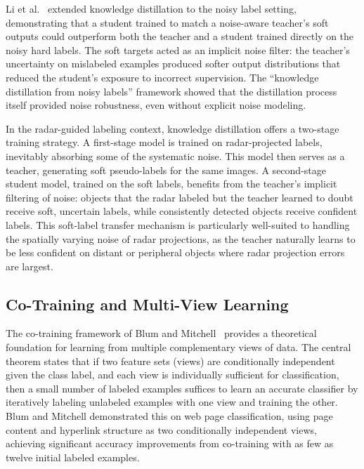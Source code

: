 Li et al.~\cite{li2017learning} extended knowledge distillation to the noisy label setting, demonstrating that a student trained to match a noise-aware teacher's soft outputs could outperform both the teacher and a student trained directly on the noisy hard labels. The soft targets acted as an implicit noise filter: the teacher's uncertainty on mislabeled examples produced softer output distributions that reduced the student's exposure to incorrect supervision. The ``knowledge distillation from noisy labels'' framework showed that the distillation process itself provided noise robustness, even without explicit noise modeling.

In the radar-guided labeling context, knowledge distillation offers a two-stage training strategy. A first-stage model is trained on radar-projected labels, inevitably absorbing some of the systematic noise. This model then serves as a teacher, generating soft pseudo-labels for the same images. A second-stage student model, trained on the soft labels, benefits from the teacher's implicit filtering of noise: objects that the radar labeled but the teacher learned to doubt receive soft, uncertain labels, while consistently detected objects receive confident labels. This soft-label transfer mechanism is particularly well-suited to handling the spatially varying noise of radar projections, as the teacher naturally learns to be less confident on distant or peripheral objects where radar projection errors are largest.



\subsection{Co-Training and Multi-View Learning}\label{subsec:cotraining}

The co-training framework of Blum and Mitchell~\cite{blum1998combining} provides a theoretical foundation for learning from multiple complementary views of data. The central theorem states that if two feature sets (views) are conditionally independent given the class label, and each view is individually sufficient for classification, then a small number of labeled examples suffices to learn an accurate classifier by iteratively labeling unlabeled examples with one view and training the other. Blum and Mitchell demonstrated this on web page classification, using page content and hyperlink structure as two conditionally independent views, achieving significant accuracy improvements from co-training with as few as twelve initial labeled examples.

